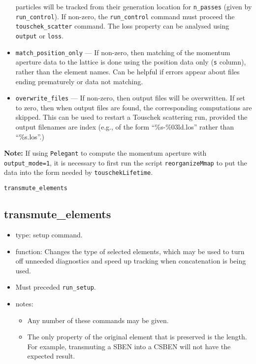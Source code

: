 \documentclass[11pt]{article}
\begin{document}
\begin{itemize}
   particles will be tracked from their generation location for \verb|n_passes| (given by \verb|run_control|). 
   If non-zero, the \verb|run_control| command must proceed the \verb |touschek_scatter| command.
   The loss property can be analysed using \verb|output| or \verb|loss|.
   \item \verb|match_position_only| --- If non-zero, then matching of the momentum aperture data to the lattice
     is done using the position data only (\verb|s| column), rather than the element names.  Can be helpful if
     errors appear about files ending prematurely or data not matching.
   \item \verb|overwrite_files| --- If non-zero, then output files will be overwritten.  If set to zero, then
     when output files are found, the corresponding computations are skipped.  This can be used to restart a
     Touschek scattering run, provided the output filenames are index (e.g., of the form ``\%s-\%03ld.los''
     rather than ``\%s.los''.)
\end{itemize}

{\bf Note:} If using \verb|Pelegant| to compute the momentum aperture with \verb|output_mode=1|, it is necessary to first run the script
  \verb|reorganizeMmap| to put the data into the form needed by \verb|touschekLifetime|.

\newpage
\begin{center}{\Large\verb|transmute_elements|}\end{center}
\subsection{transmute\_elements \label{subsec:transmuteelements}}

\begin{itemize}
\item type: setup command.
\item function: Changes the type of selected elements, which may be used to
	turn off unneeded diagnostics and speed up tracking when concatenation
	is being used.
\item Must preceded \verb|run_setup|.
\item notes: 
	\begin{itemize}
	\item Any number of these commands may be given.
	\item The only property of the original element that is preserved is
	the length.  For example, transmuting a SBEN into a CSBEN will not
	have the expected result.
	\end{itemize}
\end{itemize}
\end{document}
